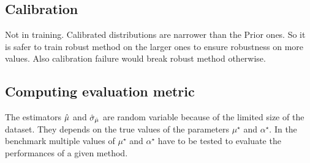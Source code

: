 




\subsection{Calibration} %
\label{sub:calibration}


Not in training.
Calibrated distributions are narrower than the Prior ones.
So it is safer to train robust method on the larger ones to ensure robustness on more values.
Also calibration failure would break robust method otherwise. 







\subsection{Computing evaluation metric} %
\label{sub:computing_evaluation_metric}



The estimators $\hat\mu$ and $\hat\sigma_{\hat\mu}$ are random variable because of the limited size of the dataset.
They depends on the true values of the parameters $\mu^\star$ and $\alpha^\star$.
In the benchmark multiple values of $\mu^\star$ and $\alpha^\star$ have to be tested to evaluate the performances of a given method.


















